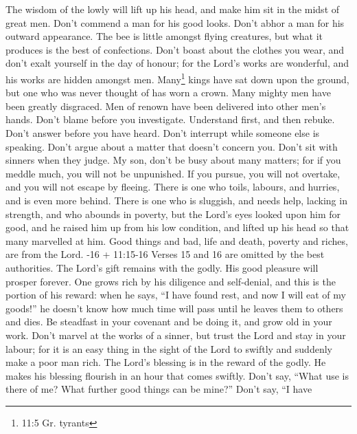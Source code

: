  The wisdom of the lowly will lift up his head, and make him
sit in the midst of great men.  Don't commend a man for his
good looks. Don't abhor a man for his outward appearance. 
The bee is little amongst flying creatures, but what it produces is the
best of confections.  Don't boast about the clothes you
wear, and don't exalt yourself in the day of honour; for the Lord's
works are wonderful, and his works are hidden amongst men. 
Many\footnote{11:5 Gr. tyrants} kings have sat down upon the ground, but
one who was never thought of has worn a crown.  Many mighty
men have been greatly disgraced. Men of renown have been delivered into
other men's hands.  Don't blame before you investigate.
Understand first, and then rebuke.  Don't answer before you
have heard. Don't interrupt while someone else is speaking. 
Don't argue about a matter that doesn't concern you. Don't sit with
sinners when they judge.  My son, don't be busy about many
matters; for if you meddle much, you will not be unpunished. If you
pursue, you will not overtake, and you will not escape by fleeing.
 There is one who toils, labours, and hurries, and is even
more behind.  There is one who is sluggish, and needs help,
lacking in strength, and who abounds in poverty, but the Lord's eyes
looked upon him for good, and he raised him up from his low condition,
 and lifted up his head so that many marvelled at him.
 Good things and bad, life and death, poverty and riches,
are from the Lord. -16 + 11:15-16 Verses 15 and 16 are
omitted by the best authorities.  The Lord's gift remains
with the godly. His good pleasure will prosper forever. 
One grows rich by his diligence and self-denial, and this is the portion
of his reward:  when he says, ``I have found rest, and now
I will eat of my goods!'' he doesn't know how much time will pass until
he leaves them to others and dies.  Be steadfast in your
covenant and be doing it, and grow old in your work.  Don't
marvel at the works of a sinner, but trust the Lord and stay in your
labour; for it is an easy thing in the sight of the Lord to swiftly and
suddenly make a poor man rich.  The Lord's blessing is in
the reward of the godly. He makes his blessing flourish in an hour that
comes swiftly.  Don't say, ``What use is there of me? What
further good things can be mine?''  Don't say, ``I have
